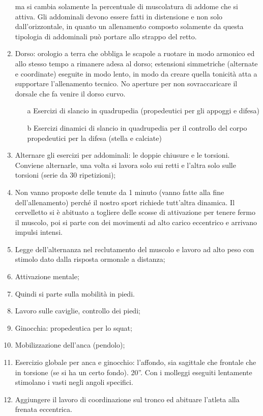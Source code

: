 \begin{enumerate}
ma si cambia solamente la percentuale di muscolatura di addome che si attiva. Gli addominali
devono essere fatti in distensione e non solo dall'orizzontale, in quanto un allenamento composto
solamente da questa tipologia di addominali può portare allo strappo del retto.
\item Dorso: orologio a terra che obbliga le scapole a ruotare in modo armonico ed allo stesso tempo a
rimanere adesa al dorso; estensioni simmetriche (alternate e coordinate) eseguite in modo lento, in
modo da creare quella tonicità atta a supportare l'allenamento tecnico. No aperture per non
sovraccaricare il dorsale che fa venire il dorso curvo.
\begin{itemize}
\item[a] Esercizi di slancio in quadrupedia (propedeutici per gli appoggi e difesa)
\item[b] Esercizi dinamici di slancio in quadrupedia per il controllo del corpo
 propedeutici per la difesa (stella e calciate)
\end{itemize}
\item Alternare gli esercizi per addominali: le doppie chiusure e le torsioni. Conviene alternarle, una volta
si lavora solo sui retti e l'altra solo sulle torsioni (serie da 30 ripetizioni);
\item Non vanno proposte delle tenute da 1 minuto (vanno fatte alla fine dell'allenamento) perché il
nostro sport richiede tutt'altra dinamica. Il cervelletto si è abituato a togliere delle scosse di
attivazione per tenere fermo il muscolo, poi si parte con dei movimenti ad alto carico eccentrico e
arrivano impulsi intensi.
\item Legge dell'alternanza nel reclutamento del muscolo e lavoro ad alto peso con stimolo dato dalla
risposta ormonale a distanza;
\item Attivazione mentale;
\item Quindi si parte sulla mobilità in piedi.
\item Lavoro sulle caviglie, controllo dei piedi;
\item Ginocchia: propedeutica per lo squat;
\item Mobilizzazione dell'anca (pendolo);
\item Esercizio globale per anca e ginocchio: l'affondo, sia sagittale che frontale che in torsione (se si ha
un certo fondo). 20”. Con i molleggi eseguiti lentamente stimolano i vasti negli angoli specifici.
\item Aggiungere il lavoro di coordinazione sul tronco ed abituare l'atleta alla frenata eccentrica.

\end{enumerate}
